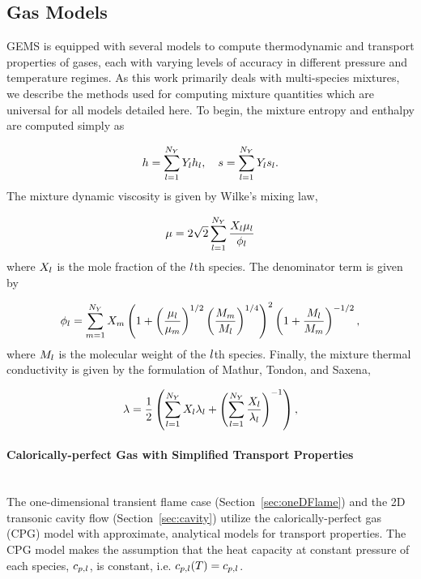 \subsection{Gas Models}\label{subsec:gasModels}

GEMS is equipped with several models to compute thermodynamic and transport properties of gases, each with varying levels of accuracy in different pressure and temperature regimes. As this work primarily deals with multi-species mixtures, we describe the methods used for computing mixture quantities which are universal for all models detailed here. To begin, the mixture entropy and enthalpy are computed simply as

\begin{equation}
	h = \sum_{l = 1}^{N_Y} Y_{l} h_{l}, \quad s = \sum_{l = 1}^{N_Y} Y_{l} s_{l}.
\end{equation}
The mixture dynamic viscosity is given by Wilke's mixing law,

\begin{equation}\label{eq:viscMix}
	\mu = 2 \sqrt{2} \sum_{l = 1}^{N_Y} \frac{X_{l} \mu_{l}}{\phi_{l}}
\end{equation}
where $X_{l}$ is the mole fraction of the $l$th species. The denominator term is given by

\begin{equation}\label{eq:viscMixDenom}
	\phi_{l} = \sum_{m = 1}^{N_Y} X_{m} \left( 1 + \left( \frac{\mu_{l}}{\mu_{m}} \right)^{1/2} \left( \frac{M_{m}}{M_{l}} \right)^{1/4} \right)^2 \left( 1 + \frac{M_{l}}{M_{m}} \right)^{-1/2},
\end{equation}
where $M_{l}$ is the molecular weight of the $l$th species. Finally, the mixture thermal conductivity is given by the formulation of Mathur, Tondon, and Saxena,

\begin{equation}\label{eq:thermCondMix}
    \lambda = \frac{1}{2} \left( \sum_{l = 1}^{N_Y} X_{l} \lambda_{l} + \left(\sum_{l = 1}^{N_Y} \frac{X_{l}}{\lambda_{l}} \right)^{-1} \right),
\end{equation}


\paragraph*{Calorically-perfect Gas with Simplified Transport Properties}\mbox{}\\

The one-dimensional transient flame case (Section~\ref{sec:oneDFlame}) and the 2D transonic cavity flow (Section~\ref{sec:cavity}) utilize the calorically-perfect gas (CPG) model with approximate, analytical models for transport properties. The CPG model makes the assumption that the heat capacity at constant pressure of each species, $c_{p,l}$, is constant, i.e. $c_{p,l}(T) = c_{p,l}$.

